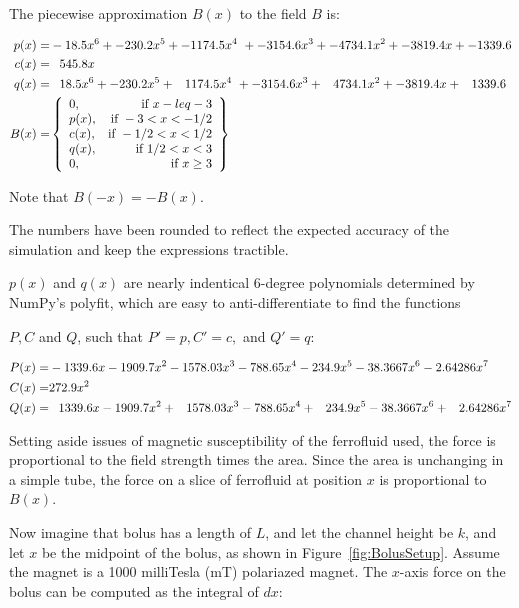 \documentclass[]{asme2ej}
\begin{document}
The piecewise approximation $B(x)$ to the field $B$ is:

\begin{align}
  p(x) = & -18.5 x^6 + -230.2 x^5 + -1174.5  x^4\
  + -3154.6 x^3 + -4734.1 x^2 + -3819.4x + -1339.6 \\
  c(x) = & \hphantom{-}545.8 x \\
  q(x) = &  \hphantom{-}18.5 x^6 + -230.2 x^5 + \hphantom{-} 1174.5x^4 \
  + -3154.6x^3 +  \hphantom{-} 4734.1x^2 + -3819.4x + \hphantom{-} 1339.6 \\
B(x) = &
\left\{
    \begin{array}{lr}
      0 , & \text{if } x -leq -3 \\
      p(x) , & \text{if } -3 < x  < -1/2 \\
      c(x) , & \text{if } -1/2 < x < 1/2 \\
      q(x) , & \text{if } 1/2 < x < 3 \\
      0 , & \text{if } x \geq 3
    \end{array}
    \right\}
    \label{eq:Bfield}
\end{align}

Note that $B(-x) = -B(x)$.

The numbers have been rounded to reflect the expected accuracy of the
simulation and keep the expressions tractible.

$p(x)$ and $q(x)$ are nearly indentical 6-degree polynomials determined
by NumPy's polyfit, which are easy to anti-differentiate to find the functions

$P,C$ and $Q$, such that $P' = p, C' = c,$ and $Q' = q$:

\begin{align}
  P(x) = & -1339.6 x - 1909.7 x^2 - 1578.03 x^3 - 788.65 x^4 - 234.9 x^5 - 38.3667 x^6 - 2.64286 x^7 \\
  C(x) = & 272.9 x^2 \\
  Q(x) = &  \hphantom{-}1339.6 x - 1909.7 x^2 + \hphantom{-}1578.03 x^3 - 788.65 x^4 + \hphantom{-}234.9 x^5 - 38.3667 x^6 + \hphantom{-}2.64286 x^7 \\
\end{align}


Setting aside issues of magnetic susceptibility of the ferrofluid used,
the force is proportional
to the field strength times the area.
Since the area is unchanging in a simple tube, the force on
a slice of ferrofluid at position $x$ is proportional to $B(x)$.

Now imagine that bolus has a length of $L$, and let the channel height be $k$, and let $x$ be
the midpoint of the bolus, as shown in Figure~\ref{fig:BolusSetup}.
Assume the magnet is a 1000 milliTesla (mT) polariazed magnet.
The $x$-axis force on the bolus can be computed as the integral of $dx$:
\end{document}
